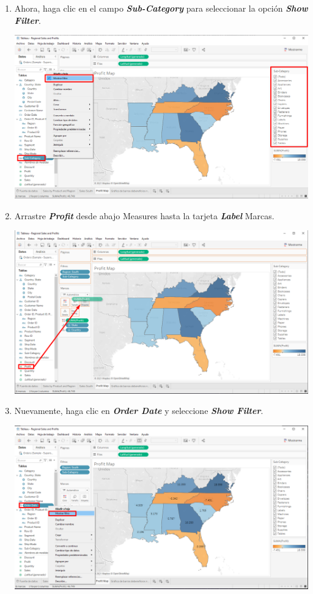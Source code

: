 \documentclass[12pt,letterpaper]{article}
\begin{document}
\begin{enumerate}
\begin{center}
        \end{center}
        \item Ahora, haga clic en el campo \textit{\textbf{Sub-Category}} para seleccionar la opción \textit{\textbf{Show Filter}}.
        \begin{center}
            \includegraphics[width=15cm]{./img/img62.png}
        \end{center}
        \item Arrastre \textit{\textbf{Profit}} desde abajo Measures hasta la tarjeta \textit{\textbf{Label}} Marcas.
        \begin{center}
            \includegraphics[width=15cm]{./img/img63.png}
        \end{center}
        \item Nuevamente, haga clic en \textit{\textbf{Order Date}} y seleccione \textit{\textbf{Show Filter}}.
        \begin{center}
            \includegraphics[width=15cm]{./img/img64.png}

\end{center}
\end{enumerate}
\end{document}
